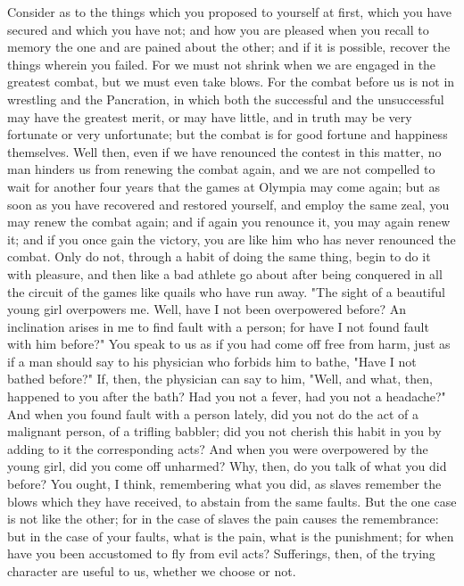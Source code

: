 \documentclass[a4paper]{article}
\begin{document}
    Consider as to the things which you proposed to yourself at first, which
you have secured and which you have not; and how you are pleased when you
recall to memory the one and are pained about the other; and if it is possible,
recover the things wherein you failed. For we must not shrink when we are
engaged in the greatest combat, but we must even take blows. For the combat
before us is not in wrestling and the Pancration, in which both the successful
and the unsuccessful may have the greatest merit, or may have little, and in
truth may be very fortunate or very unfortunate; but the combat is for good
fortune and happiness themselves. Well then, even if we have renounced the
contest in this matter, no man hinders us from renewing the combat again, and
we are not compelled to wait for another four years that the games at Olympia
may come again; but as soon as you have recovered and restored yourself, and
employ the same zeal, you may renew the combat again; and if again you renounce
it, you may again renew it; and if you once gain the victory, you are like him
who has never renounced the combat. Only do not, through a habit of doing the
same thing, begin to do it with pleasure, and then like a bad athlete go about
after being conquered in all the circuit of the games like quails who have run
away.
    "The sight of a beautiful young girl overpowers me. Well, have I not been
overpowered before? An inclination arises in me to find fault with a person;
for have I not found fault with him before?" You speak to us as if you had come
off free from harm, just as if a man should say to his physician who forbids
him to bathe, "Have I not bathed before?" If, then, the physician can say to
him, "Well, and what, then, happened to you after the bath? Had you not a
fever, had you not a headache?" And when you found fault with a person lately,
did you not do the act of a malignant person, of a trifling babbler; did you
not cherish this habit in you by adding to it the corresponding acts? And when
you were overpowered by the young girl, did you come off unharmed? Why, then,
do you talk of what you did before? You ought, I think, remembering what you
did, as slaves remember the blows which they have received, to abstain from the
same faults. But the one case is not like the other; for in the case of slaves
the pain causes the remembrance: but in the case of your faults, what is the
pain, what is the punishment; for when have you been accustomed to fly from
evil acts? Sufferings, then, of the trying character are useful to us, whether
we choose or not.
\end{document}
